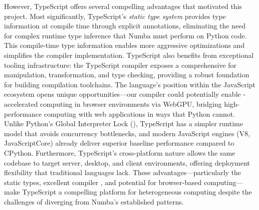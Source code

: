 However, TypeScript offers several compelling advantages that motivated this project. Most significantly, TypeScript's \textit{static type system} provides type information at compile time through explicit annotations, eliminating the need for complex runtime type inference that Numba must perform on Python code. This compile-time type information enables more aggressive optimizations and simplifies the compiler implementation. TypeScript also benefits from exceptional tooling infrastructure: the TypeScript compiler exposes a comprehensive  for  manipulation, transformation, and type checking, providing a robust foundation for building compilation toolchains. The language's position within the JavaScript ecosystem opens unique opportunities---our compiler could potentially enable -accelerated computing in browser environments via WebGPU, bridging high-performance computing with web applications in ways that Python cannot. Unlike Python's Global Interpreter Lock (), TypeScript has a simpler runtime model that avoids concurrency bottlenecks, and modern JavaScript engines (V8, JavaScriptCore) already deliver superior baseline performance compared to CPython. Furthermore, TypeScript's cross-platform nature allows the same codebase to target server, desktop, and client environments, offering deployment flexibility that traditional  languages lack. These advantages---particularly the static types, excellent compiler , and potential for browser-based  computing---make TypeScript a compelling platform for heterogeneous computing despite the challenges of diverging from Numba's established patterns. 
